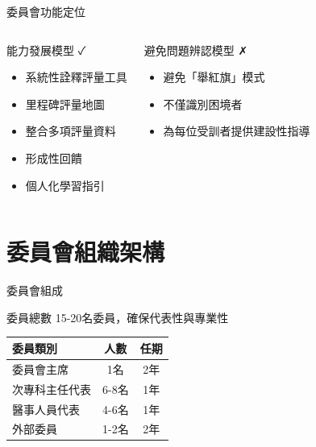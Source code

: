 \documentclass[aspectratio=169,12pt]{beamer}
\begin{document}
\begin{frame}{委員會功能定位}
\begin{columns}[T]
\begin{block}{能力發展模型 ✓}
\begin{itemize}
    \item 系統性詮釋評量工具
    \item 里程碑評量地圖
    \item 整合多項評量資料
    \item 形成性回饋
    \item 個人化學習指引
\end{itemize}
\end{block}

\begin{alertblock}{避免問題辨認模型 ✗}
\begin{itemize}
    \item 避免「舉紅旗」模式
    \item 不僅識別困境者
    \item 為每位受訓者提供建設性指導
\end{itemize}
\end{alertblock}
\end{columns}
\end{frame}

\section{委員會組織架構}

\begin{frame}{委員會組成}
\begin{block}{委員總數}
15-20名委員，確保代表性與專業性
\end{block}

\begin{table}
\footnotesize
\begin{tabular}{lcc}
\toprule
\textbf{委員類別} & \textbf{人數} & \textbf{任期} \\
\midrule
委員會主席 & 1名 & 2年 \\
次專科主任代表 & 6-8名 & 1年 \\
醫事人員代表 & 4-6名 & 1年 \\
外部委員 & 1-2名 & 2年 \\
\bottomrule
\end{tabular}
\end{table}
\end{frame}
\end{document}
